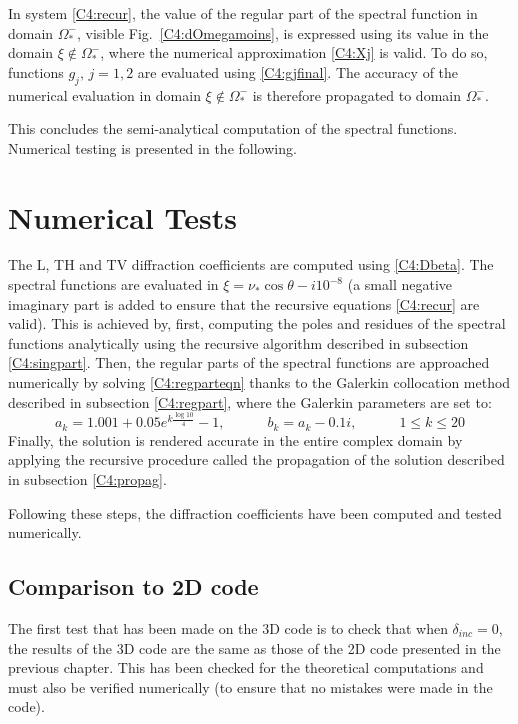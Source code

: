 In system \eqref{C4:recur}, the value of the regular part of the spectral function in domain $\Omega_*^-$, visible Fig.~\ref{C4:dOmegamoins}, is expressed using its value in the domain $\xi \notin \Omega_*^-$, where the numerical approximation \eqref{C4:Xj} is valid. To do so, functions $g_j,\, j=1,2$ are evaluated using \eqref{C4:gjfinal}. The accuracy of the numerical evaluation in domain $\xi \notin \Omega_*^-$ is therefore propagated to domain $\Omega_*^-$. 

This concludes the semi-analytical computation of the spectral functions. Numerical testing is presented in the following.

\section{Numerical Tests}
The L, TH and TV diffraction coefficients are computed using \eqref{C4:Dbeta}. The spectral functions are evaluated in $\xi=\nu_*\cos\theta -i10^{-8}$ (a small negative imaginary part is added to ensure that the recursive equations \eqref{C4:recur} are valid). This is achieved by, first, computing the poles and residues of the spectral functions analytically using the recursive algorithm described in subsection \ref{C4:singpart}. Then, the regular parts of the spectral functions are approached numerically by solving \eqref{C4:regparteqn} thanks to the Galerkin collocation method described in subsection \ref{C4:regpart}, where the Galerkin parameters are set to:
\begin{equation}
a_k=1.001+0.05e^{k\frac{\log 10}{4}}-1, \hspace{3em} b_k=a_k-0.1i, \hspace{3em} 1\leq k\leq20
\end{equation}
Finally, the solution is rendered accurate in the entire complex domain by applying the recursive procedure called the propagation of the solution described in subsection \ref{C4:propag}.

Following these steps, the diffraction coefficients have been computed and tested numerically.

\subsection{Comparison to 2D code}
The first test that has been made on the 3D code is to check that when $\delta_{inc}=0$, the results of the 3D code are the same as those of the 2D code presented in the previous chapter. This has been checked for the theoretical computations and must also be verified numerically (to ensure that no mistakes were made in the code).

